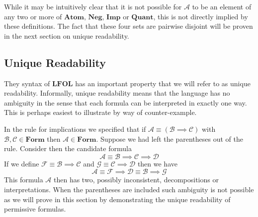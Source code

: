 \documentclass[12pt]{article}
\theoremstyle{break}
\theoremstyle{break}
\theoremstyle{break}
\theoremstyle{break}
\theoremstyle{break}
\newtheorem{informal definition}[definition]{Informal Definition}
\newcommand{\mc}[1]{\mathcal{#1}}
\begin{document}
While it may be intuitively clear that it is not possible for $\mc{A}$ to be an element of any two or more of $\textbf{Atom}$, $\textbf{Neg}$, $\textbf{Imp}$ or $\textbf{Quant}$, this is not directly implied by these definitions.
The fact that these four sets are pairwise disjoint will be proven in the next section on unique readability.

\subsection{Unique Readability}

They syntax of $\textbf{LFOL}$ has an important property that we will refer to as unique readability.
Informally, unique readability means that the language has no ambiguity in the sense that each formula can be interpreted in exactly one way.
This is perhaps easiest to illustrate by way of counter-example.

In the rule for implications we specified that if $\mc{A}\equiv (\mc{B}\implies \mc{C})$ with $\mc{B},\mc{C}\in\textbf{Form}$ then $\mc{A}\in\textbf{Form}$.
Suppose we had left the parentheses out of the rule.
Consider then the candidate formula
$$
\mc{A}\equiv \mc{B}\implies \mc{C}\implies \mc{D}
$$
If we define $\mc{F} \equiv \mc{B}\implies \mc{C}$ and $\mc{G}\equiv \mc{C}\implies \mc{D}$ then we have
$$
\mc{A}\equiv \mc{F}\implies \mc{D} \equiv \mc{B}\implies \mc{G}
$$
This formula $\mc{A}$ then has two, possibly inconsistent, decompositions or interpretations.
When the parentheses are included such ambiguity is not possible as we will prove in this section by demonstrating the unique readability of permissive formulas.
\end{document}
